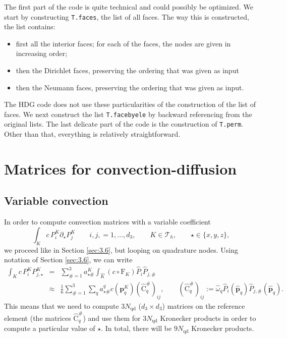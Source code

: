 \documentclass[10pt,english]{article}
\newcommand{\smallfrac}[2]{{\textstyle\frac{#1}{#2}}}
\newcommand{\Nnd}{{N_{\mathrm{qd}}}}
\newcommand{\pp}{\widehat{\mathbf p}}
\begin{document}
The first part of the code is quite technical and could possibly be optimized. We start by constructing {\tt T.faces}, the list of all faces. The way this is constructed, the list contains:
\begin{itemize}
\item first all the interior faces; for each of the faces, the nodes are given in increasing order;
\item then the Dirichlet faces, preserving the ordering that was given as input
\item then the Neumann faces, preserving the ordering that was given as input.
\end{itemize}
The HDG code does not use these particularities of the construction of the list of faces. We next construct the list {\tt T.facebyele} by backward referencing from the original lists. The last delicate part of the code is the construction of {\tt T.perm}. Other than that, everything is relatively straightforward.







\section{Matrices for convection-diffusion}

\subsection{Variable convection}

In order to compute convection matrices with a variable coefficient
\[
\int_K c\, P_i^K \partial_\star P_j^K \qquad i,j,=1,\ldots,d_3, \qquad K \in \mathcal T_h, \qquad \star\in \{x,y,z\},
\]
we proceed like in Section \ref{sec:3.6}, but looping on quadrature nodes. Using notation of Section \ref{sec:3.6}, we can write
\begin{eqnarray*}
\int_K c\, P_i^K P_{j,\star}^K &=& \sum_{\#=1}^3 a_{\star\#}^K \int_{\widehat K} (c\circ \mathrm F_K) \widehat P_i \widehat P_{j,\#}\\
&\approx& \smallfrac16 \sum_{\#=1}^3 \sum_q a_{\star\#}^q c(\mathbf p_q^K) (\widehat{\mathrm C}_q^\#)_{ij}, \qquad 
(\widehat{\mathrm C}_q^\#)_{ij} := \widehat\omega_q \widehat P_i(\pp_q) \widehat P_{j,\#}(\pp_q).
\end{eqnarray*}
This means that we need to compute $3\Nnd$ ($d_3\times d_3$) matrices on the reference element (the matrices $\widehat{\mathrm C}_q^\#$) and use them for $3\Nnd$ Kronecker products in order to compute a particular value of $\star$. In total, there will be $9\Nnd$ Kronecker products.
\end{document}
